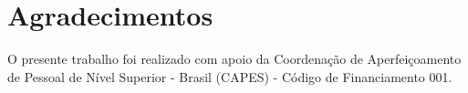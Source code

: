 \documentclass[12pt]{article}
\begin{document}




\section*{Agradecimentos}\label{secao:agradecimentos}

O presente trabalho foi realizado com apoio da Coordenação de Aperfeiçoamento de Pessoal de Nível Superior - Brasil (CAPES) - Código de Financiamento 001.


%

\end{document}
